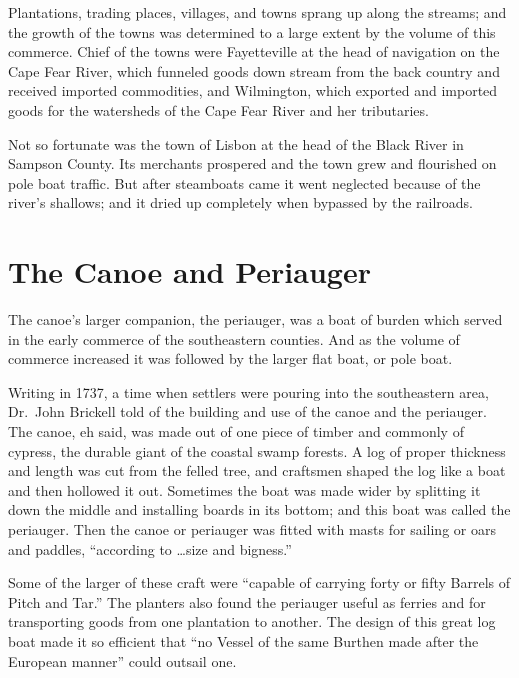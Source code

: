 \documentclass[11pt, a5paper, openright]{book}
\begin{document}
Plantations, trading places, villages, and towns sprang up along the
streams; and the growth of the towns was determined to a large extent
by the volume of this commerce.  Chief of the towns were Fayetteville
at the head of navigation on the Cape Fear River, which funneled goods
down stream from the back country and received imported commodities,
and Wilmington, which exported and imported goods for the watersheds
of the Cape Fear River and her tributaries.\par

Not so fortunate was the town of Lisbon at the head of the Black River
in Sampson County.  Its merchants prospered and the town grew and
flourished on pole boat traffic.  But after steamboats came it went
neglected because of the river's shallows; and it dried up completely
when bypassed by the railroads.\par

\section{The Canoe and Periauger}

The canoe's larger companion, the periauger, was a boat of burden
which served in the early commerce of the southeastern counties.  And
as the volume of commerce increased it was followed by the larger flat
boat, or pole boat.\par

Writing in 1737, a time when settlers were pouring into the
southeastern area, Dr.\ John Brickell told of the building and use of
the canoe and the periauger.  The canoe, eh said, was made out of one
piece of timber and commonly of cypress, the durable giant of the
coastal swamp forests.  A log of proper thickness and length was cut
from the felled tree, and craftsmen shaped the log like a boat and
then hollowed it out.  Sometimes the boat was made wider by splitting
it down the middle and installing boards in its bottom; and this boat
was called the periauger.  Then the canoe or periauger was fitted with
masts for sailing or oars and paddles, ``according to \ldots size and
bigness.''\par

Some of the larger of these craft were ``capable of carrying forty or
fifty Barrels of Pitch and Tar.''  The planters also found the
periauger useful as ferries and for transporting goods from one
plantation to another.  The design of this great log boat made it so
efficient that ``no Vessel of the same Burthen made after the European
manner'' could outsail one.\citep[260-261]{brickellj}\par
\end{document}
